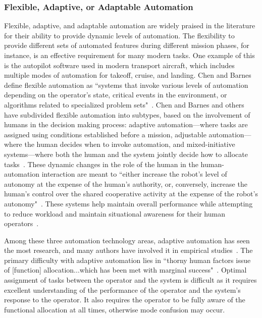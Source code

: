 \subsubsection{Flexible, Adaptive, or Adaptable Automation}
Flexible, adaptive, and adaptable automation are widely praised in the literature for their ability to provide dynamic levels of automation.
The flexibility to provide different sets of automated features during different mission phases, for instance, is an effective requirement for many modern tasks.
One example of this is the autopilot software used in modern transport aircraft, which includes multiple modes of automation for takeoff, cruise, and landing.
Chen and Barnes define flexible automation as ``systems that invoke various levels of automation depending on the operator's state, critical events in the environment, or algorithms related to specialized problem sets"~\citep{chen_humanagent_2014}.
Chen and Barnes and others have subdivided flexible automation into subtypes, based on the involvement of humans in the decision making process: adaptive automation—where tasks are assigned using conditions established before a mission, adjustable automation—where the human decides when to invoke automation, and mixed-initiative systems—where both the human and the system jointly decide how to allocate tasks~\citep{chen_humanagent_2014, beer_toward_2014}.
These dynamic changes in the role of the human in the human-automation interaction are meant to ``either increase the robot's level of autonomy at the expense of the human's authority, or, conversely, increase the human's control over the shared cooperative activity at the expense of the robot's autonomy"~\citep{losey_review_2018}.
These systems help maintain overall performance while attempting to reduce workload and maintain situational awareness for their human operators~\citep{kaber_situation_2006}.

Among these three automation technology areas, adaptive automation has seen the most research, and many authors have involved it in empirical studies~\citep{vagia_literature_2016}.
The primary difficulty with adaptive automation lies in ``thorny human factors issue of [function] allocation...which has been met with marginal success"~\citep{vagia_literature_2016}.
Optimal assignment of tasks between the operator and the system is difficult as it requires excellent understanding of the performance of the operator and the system's response to the operator.
It also requires the operator to be fully aware of the functional allocation at all times, otherwise mode confusion may occur.

